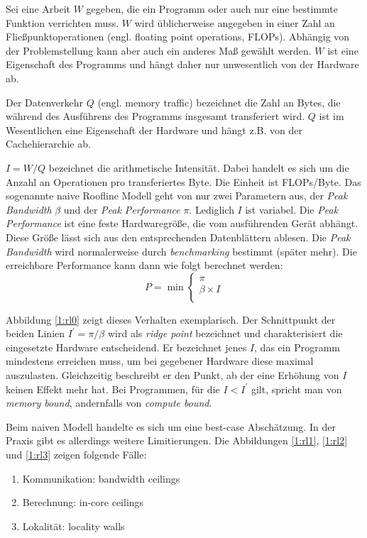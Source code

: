		Sei eine \Gls{Arbeit} $W$ gegeben, die ein Programm oder auch nur eine bestimmte Funktion verrichten muss. $W$ wird üblicherweise angegeben in einer Zahl an Fließpunktoperationen (engl. floating point operations, FLOPs). Abhängig von der Problemstellung kann aber auch ein anderes Maß gewählt werden. $W$ ist eine Eigenschaft des Programms und hängt daher nur unwesentlich von der Hardware ab.
		
		Der \Gls{Datenverkehr} $Q$ (engl. memory traffic) bezeichnet die Zahl an Bytes, die während des Ausführens des Programms insgesamt transferiert wird. $Q$ ist im Wesentlichen eine Eigenschaft der Hardware und hängt z.B. von der Cachehierarchie ab.

		$I = W/Q$ bezeichnet die \gls{arithmetische Intensität}. Dabei handelt es sich um die Anzahl an Operationen pro transferiertes Byte. Die Einheit ist FLOPs/Byte.
		Das sogenannte naive Roofline Modell geht von nur zwei Parametern aus, der \textit{\Gls{Peak Bandwidth}} $\beta$ und der \textit{\Gls{Peak Performance}} $\pi$. Lediglich $I$ ist variabel. Die \textit{\Gls{Peak Performance}} ist eine feste Hardwaregröße, die vom ausführenden Gerät abhängt. Diese Größe lässt sich aus den entsprechenden Datenblättern ablesen. Die \textit{\Gls{Peak Bandwidth}} wird normalerweise durch \textit{benchmarking} bestimmt (später mehr). Die erreichbare \Gls{Performance} kann dann wie folgt berechnet werden:
		\begin{equation}
			P = \min \left\{ \begin{array}{ll} \pi \\
			\beta\times I \\ \end{array}\right.
		\end{equation}
		
		Abbildung \ref{1:rl0} zeigt dieses Verhalten exemplarisch. Der Schnittpunkt der beiden Linien $I^{\prime} = \pi/\beta$ wird als \textit{ridge point} bezeichnet und charakterisiert die eingesetzte Hardware entscheidend. Er bezeichnet jenes $I$, das ein Programm mindestens erreichen muss, um bei gegebener Hardware diese maximal auszulasten. Gleichzeitig beschreibt er den Punkt, ab der eine Erhöhung von $I$ keinen Effekt mehr hat. Bei Programmen, für die $I < I^{\prime}$ gilt, spricht man von \textit{memory bound}, andernfalls von \textit{compute bound}.
		
		Beim naiven Modell handelte es sich um eine best-case Abschätzung. In der Praxis gibt es allerdings weitere Limitierungen. Die Abbildungen \ref{1:rl1}, \ref{1:rl2} und \ref{1:rl3} zeigen folgende Fälle:
		
		\begin{enumerate}		
			\item Kommunikation: bandwidth ceilings
			\item Berechnung: in-core ceilings
			\item Lokalität: locality walls
		\end{enumerate}	